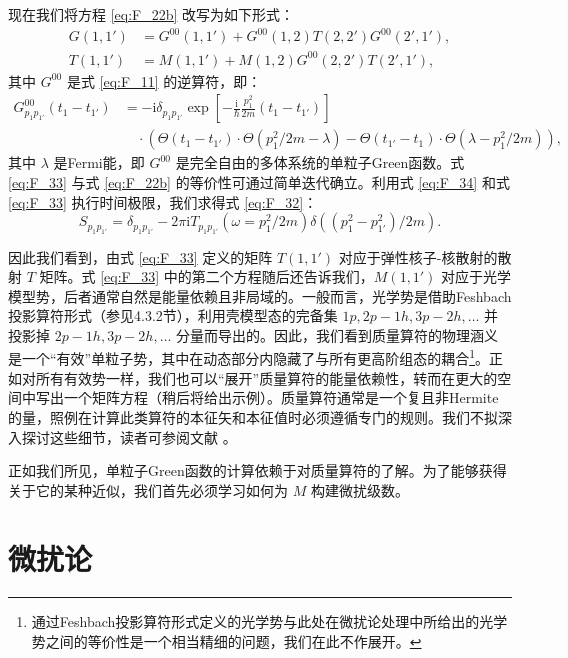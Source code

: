 现在我们将方程 \ref{eq:F_22b} 改写为如下形式：
\begin{align}
G(1,1') & =G^{00}(1,1')+G^{00}(1,2)T(2,2')G^{00}(2',1'),\nonumber \\
T(1,1') & =M(1,1')+M(1,2)G^{00}(2,2')T(2',1'),\label{eq:F_33}
\end{align}
其中 $G^{00}$ 是式 \ref{eq:F_11} 的逆算符，即：
\begin{align}
G^{00}_{p_{1}p_{1'}}(t_{1}-t_{1'}) & =-\mathrm{i}\delta_{p_{1}p_{1'}}\exp\left[-\frac{\mathrm{i}}{\hbar}\frac{p^{2}_{1}}{2m}(t_{1}-t_{1'})\right]\nonumber \\
 & \quad\cdot\left(\Theta(t_{1}-t_{1'})\cdot\Theta(p^{2}_{1}/2m-\lambda)-\Theta(t_{1'}-t_{1})\cdot\Theta(\lambda-p^{2}_{1}/2m)\right),\label{eq:F_34}
\end{align}
其中 $\lambda$ 是Fermi能，即 $G^{00}$ 是完全自由的多体系统的单粒子Green函数。式 \ref{eq:F_33}
与式 \ref{eq:F_22b} 的等价性可通过简单迭代确立。利用式 \ref{eq:F_34} 和式 \ref{eq:F_33}
执行时间极限，我们求得式 \ref{eq:F_32}：
\begin{equation}
S_{p_{1}p_{1'}}=\delta_{p_{1}p_{1'}}-2\pi\mathrm{i}T_{p_{1}p_{1'}}(\omega=p^{2}_{1}/2m)\delta\left((p^{2}_{1}-p^{2}_{1'})/2m\right).\label{eq:F_35}
\end{equation}

因此我们看到，由式 \ref{eq:F_33} 定义的矩阵 $T(1,1')$ 对应于弹性核子-核散射的散射 $T$ 矩阵。式
\ref{eq:F_33} 中的第二个方程随后还告诉我们，$M(1,1')$ 对应于光学模型势，后者通常自然是能量依赖且非局域的。一般而言，光学势是借助Feshbach投影算符形式（参见4.3.2节），利用壳模型态的完备集
$1p,2p-1h,3p-2h,\dots$ 并投影掉 $2p-1h,3p-2h,\dots$ 分量而导出的。因此，我们看到质量算符的物理涵义是一个“有效”单粒子势，其中在动态部分内隐藏了与所有更高阶组态的耦合\footnote{通过Feshbach投影算符形式定义的光学势与此处在微扰论处理中所给出的光学势之间的等价性是一个相当精细的问题，我们在此不作展开。}。正如对所有有效势一样，我们也可以“展开”质量算符的能量依赖性，转而在更大的空间中写出一个矩阵方程（稍后将给出示例）。质量算符通常是一个复且非Hermite的量，照例在计算此类算符的本征矢和本征值时必须遵循专门的规则。我们不拟深入探讨这些细节，读者可参阅文献
\cite[附录C]{BD71}。

正如我们所见，单粒子Green函数的计算依赖于对质量算符的了解。为了能够获得关于它的某种近似，我们首先必须学习如何为 $M$ 构建微扰级数。

\section{微扰论}

